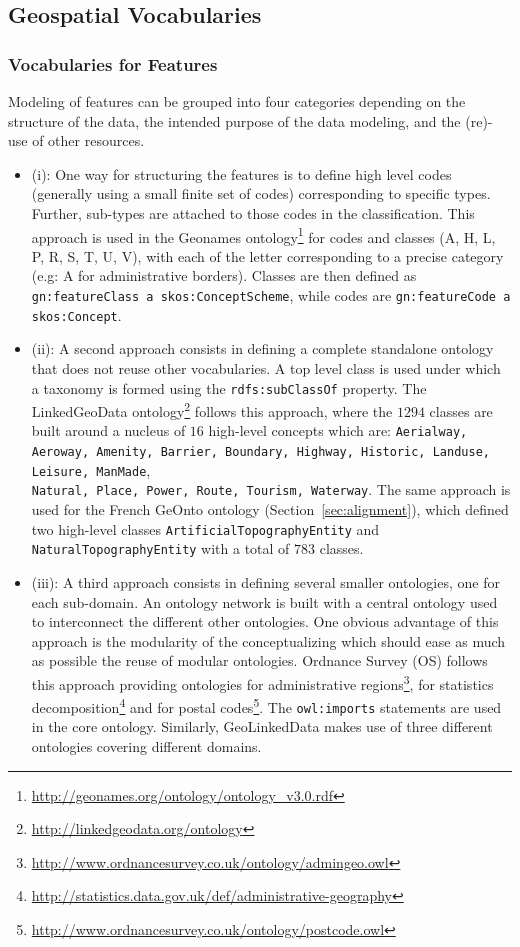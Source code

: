 \subsection{Geospatial Vocabularies}
\label{sec:geospatialvocabs} 

\subsubsection{Vocabularies for Features}
Modeling of features can be grouped into four categories depending on the structure of the data, the intended purpose of the data modeling, and the (re)-use of other resources.
\begin{itemize}
  \item (i): One way for structuring the features is to define high level codes (generally using a small finite set of codes) corresponding to specific
      types. Further, sub-types are attached to those codes in the classification. This approach is used in the Geonames ontology\footnote{\url{http://geonames.org/ontology/ontology_v3.0.rdf}} for codes and classes (A, H, L, P, R, S, T, U, V), with each of the letter corresponding to a precise category (e.g: A for administrative borders). Classes are then defined as \texttt{gn:featureClass a skos:ConceptScheme}, while codes are \texttt{gn:featureCode a skos:Concept}.
  \item (ii): A second approach consists in defining a complete standalone ontology that does not reuse other vocabularies. A top level class is used under which a taxonomy is formed using the \texttt{rdfs:subClassOf} property. The LinkedGeoData ontology\footnote{\url{http://linkedgeodata.org/ontology}} follows this approach, where the $1294$ classes are built around a nucleus of $16$ high-level concepts which are: \texttt{Aerialway, Aeroway, Amenity, Barrier, Boundary, Highway, Historic, Landuse, Leisure, ManMade},\\ \texttt{Natural, Place, Power, Route, Tourism, Waterway}. The same approach is used for the French GeOnto ontology (Section~\ref{sec:alignment}), which defined two high-level classes \texttt{ArtificialTopographyEntity} and \texttt{Natural\-TopographyEntity} with a total of $783$ classes.
  \item (iii): A third approach consists in defining several smaller ontologies, one for each sub-domain. An ontology network is built with a central ontology used to interconnect the different other ontologies. One obvious advantage of this approach is the modularity of the conceptualizing which should ease as much as possible the reuse of modular ontologies. Ordnance Survey (OS) follows this approach providing ontologies for administrative regions\footnote{\url{http://www.ordnancesurvey.co.uk/ontology/admingeo.owl}}, for statistics decomposition\footnote{\url{http://statistics.data.gov.uk/def/administrative-geography}} and for postal codes\footnote{\url{http://www.ordnancesurvey.co.uk/ontology/postcode.owl}}. The \texttt{owl:imports} statements are used in the core ontology. Similarly, GeoLinkedData makes use of three different ontologies covering different domains.

\end{itemize}
